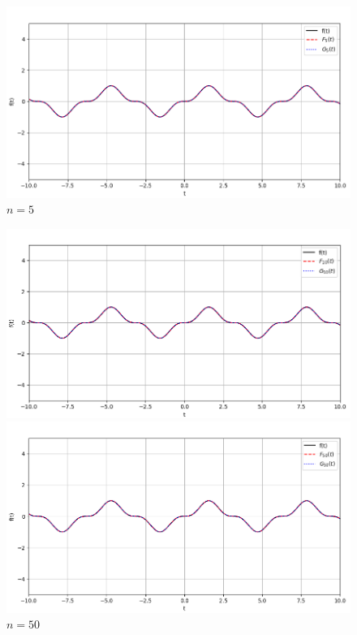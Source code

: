 \documentclass[a4paper]{article}
\begin{document}
\begin{figure}[H]
\begin{minipage}{0.5\textwidth}
        \caption{$n = 3$}
    \end{minipage}\hfill
    \begin{minipage}{0.5\textwidth}
        \centering \includegraphics[width=\textwidth]{odd_func/5.png}
        \caption{$n = 5$}
    \end{minipage}
\end{figure}
\begin{figure}[H]
    \begin{minipage}{0.5\textwidth}
        \centering \includegraphics[width=\textwidth]{odd_func/10.png}
        \caption{$n = 10$}
    \end{minipage}
    \begin{minipage}{0.5\textwidth}
        \centering \includegraphics[width=\textwidth]{odd_func/50.png}
        \caption{$n = 50$}
    \end{minipage}
\end{figure}\noindent\
\end{document}
